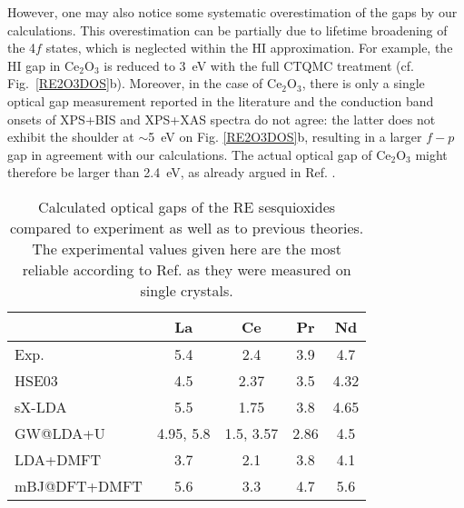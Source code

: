 \documentclass[aps,prb,twocolumn,amsmath,amssymb]{revtex4}
\begin{document}
 However, one may also notice some systematic overestimation of the gaps  by our calculations. This overestimation can be partially due to lifetime broadening of the 4$f$ states, which is neglected within the HI approximation. For example, the HI gap in Ce$_2$O$_3$ is reduced to 3~eV with the full CTQMC treatment  (cf. Fig.~\ref{RE2O3DOS}b). Moreover, in the case of Ce$_2$O$_3$, there is only a single optical gap measurement reported in the literature and the conduction band onsets of XPS+BIS\cite{Allen1985} and XPS+XAS\cite{Mullins1998} spectra do not agree: the latter does not exhibit the shoulder at $\sim$5~eV on Fig. \ref{RE2O3DOS}b, resulting in a larger $f - p$ gap in agreement with our calculations. The actual optical gap of Ce$_2$O$_3$ might therefore be larger than 2.4~eV, as already argued in Ref. .



\begin{table}[!h]
\begin{center}
		\begin{ruledtabular}
		\renewcommand{\arraystretch}{1.2}
\begin{tabular} {l | c c c c }
      & La & Ce & Pr & Nd  \\
  \hline
     Exp.\textsuperscript{\cite{prokofiev1996}} & 5.4 & 2.4 & 3.9 & 4.7 \\
     HSE03\textsuperscript{\cite{Gillen2013}} & 4.5 & 2.37 & 3.5 & 4.32 \\
   sX-LDA\textsuperscript{\cite{Gillen2013}} & 5.5 & 1.75 & 3.8 & 4.65 \\
   GW@LDA+U & 4.95\cite{Jiang2012}, 5.8\cite{Jiang2018} & 1.5\cite{Jiang2012}, 3.57\cite{Jiang2018} & 2.86\cite{Jiang2012} & 4.5\cite{Jiang2012} \\
   LDA+DMFT\textsuperscript{\cite{Tomczak2007}} & 3.7 & 2.1 & 3.8 & 4.1 \\
    mBJ@DFT+DMFT & 5.6 & 3.3 & 4.7 & 5.6 \\
\end{tabular}
\end{ruledtabular}
 \caption{\label{Gaps}Calculated optical gaps of the RE sesquioxides compared to experiment as well as to previous theories. 
 	The experimental values given here are the most reliable according to Ref.  as they were measured on single crystals.
 }
 \end{center}
\end{table}
\end{document}
